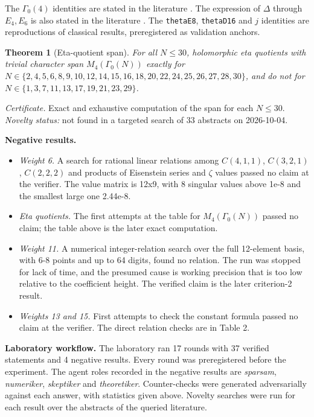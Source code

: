 \documentclass[10pt,twocolumn]{article}
\providecommand{\tightlist}{\setlength{\itemsep}{0pt}\setlength{\parskip}{0pt}}
\newtheorem{theorem}{Theorem}\newtheorem{conjecture}{Conjecture}\newtheorem{proposition}{Proposition}\newtheorem{lemma}{Lemma}\newtheorem{corollary}{Corollary}
\theoremstyle{definition}\newtheorem{definition}{Definition}\newtheorem{example}{Example}
\begin{document}
The \(\Gamma_0(4)\) identities are stated in the literature \cite{Vasuki202671v1}. The expression of \(\Delta\) through \(E_4,E_6\) is also stated in the literature \cite{Jorgenson201542v1}. The \texttt{thetaE8}, \texttt{thetaD16} and \(j\) identities are reproductions of classical results, preregistered as validation anchors.

\begin{theorem}[Eta-quotient span]
For all \(N\le 30\), holomorphic eta quotients with trivial character span \(M_4(\Gamma_0(N))\) exactly for \(N\in\{2, 4, 5, 6, 8, 9, 10, 12, 14, 15, 16, 18, 20, 22, 24, 25, 26, 27, 28, 30\}\), and do not for \(N\in\{1, 3, 7, 11, 13, 17, 19, 21, 23, 29\}\).
\end{theorem}

\emph{Certificate.} Exact and exhaustive computation of the span for each \(N\le30\). \emph{Novelty status:} not found in a targeted search of 33 abstracts on 2026-10-04.

\textbf{Negative results.}

\begin{itemize}
\tightlist
\item
  \emph{Weight 6.} A search for rational linear relations among \(C(4,1,1)\), \(C(3,2,1)\), \(C(2,2,2)\) and products of Eisenstein series and \(\zeta\) values passed no claim at the verifier. The value matrix is 12x9, with 8 singular values above 1e-8 and the smallest large one 2.44e-8.
\item
  \emph{Eta quotients.} The first attempts at the table for \(M_4(\Gamma_0(N))\) passed no claim; the table above is the later exact computation.
\item
  \emph{Weight 11.} A numerical integer-relation search over the full 12-element basis, with 6-8 points and up to 64 digits, found no relation. The run was stopped for lack of time, and the presumed cause is working precision that is too low relative to the coefficient height. The verified claim is the later criterion-2 result.
\item
  \emph{Weights 13 and 15.} First attempts to check the constant formula passed no claim at the verifier. The direct relation checks are in Table 2.
\end{itemize}

\textbf{Laboratory workflow.} The laboratory ran 17 rounds with 37 verified statements and 4 negative results. Every round was preregistered before the experiment. The agent roles recorded in the negative results are \emph{sparsam}, \emph{numeriker}, \emph{skeptiker} and \emph{theoretiker}. Counter-checks were generated adversarially against each answer, with statistics given above. Novelty searches were run for each result over the abstracts of the queried literature.
\end{document}
